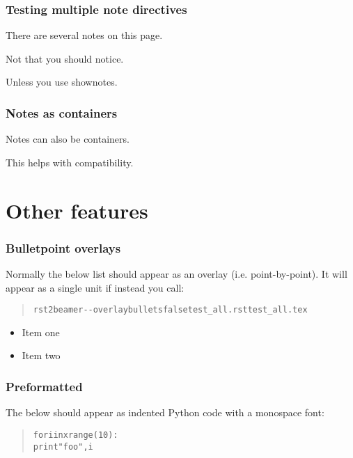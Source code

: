 \documentclass[t]{beamer}
\begin{document}
\begin{frame}[fragile]
\frametitle{Testing multiple note directives}


There are several notes on this page.

Not that you should notice.

Unless you use \textquotedbl{}shownotes\textquotedbl{}.

\end{frame}

\begin{frame}[fragile]
\frametitle{Notes as containers}


Notes can also be containers.

This helps with compatibility.

\end{frame}


\section{Other features%
  \label{other-features}%
}

\begin{frame}[fragile]
\frametitle{Bulletpoint overlays}


Normally the below list should appear as an overlay (i.e. point-by-point). It
will appear as a single unit if instead you call:

\begin{quote}
\begin{alltt}
rst2beamer -{}-overlaybullets false test_all.rst test_all.tex
\end{alltt}
\end{quote}
\begin{itemize}[<+-| alert@+>]

\item Item one

\item Item two
\end{itemize}

\end{frame}

\begin{frame}[fragile]
\frametitle{Preformatted}


The below should appear as indented Python code with a monospace font:

\begin{quote}
\begin{alltt}
for i in xrange (10):
        print "foo", i
\end{alltt}
\end{quote}

\end{frame}
\end{document}
